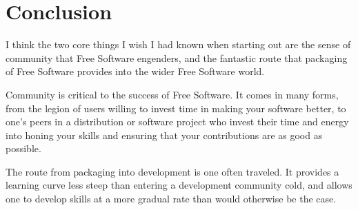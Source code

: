 \section*{Conclusion}
I think the two core things I wish I had known when starting out are the sense of community that Free Software engenders, and the fantastic route that packaging of Free Software provides into the wider Free Software world. 

Community is critical to the success of Free Software. It comes in many forms, from the legion of users willing to invest time in making your software better, to one’s peers in a distribution or software project who invest their time and energy into honing your skills and ensuring that your contributions are as good as possible. 

The route from packaging into development is one often traveled. It provides a learning curve less steep than entering a development community cold, and allows one to develop skills at a more gradual rate than would otherwise be the case.  
